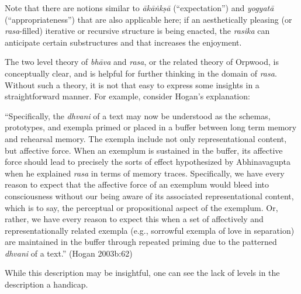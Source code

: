 Note that there are notions similar to \textsl{ākāṅkṣā} (“expectation”) and \textsl{yogyatā} (“appropriateness”) that are also applicable here; if an aesthetically pleasing (or \textsl{rasa}-filled) iterative or recursive structure is being enacted, the \textsl{rasika} can anticipate certain substructures and that increases the enjoyment.

The two level theory of \textsl{bhāva} and \textsl{rasa}, or the related theory of Orpwood, is conceptually clear, and is helpful for further thinking in the domain of \textsl{rasa}. Without such a theory, it is not that easy to express some insights in a straightforward manner. For example, consider Hogan’s explanation: 

\begin{myquote}
“Specifically, the \textsl{dhvani} of a text may now be understood as the schemas, prototypes, and exempla primed or placed in a buffer between long term memory and rehearsal memory. The exempla include not only representational content, but affective force. When an exemplum is sustained in the buffer, its affective force should lead to precisely the sorts of effect hypothesized by Abhinavagupta when he explained \textsl{rasa} in terms of memory traces. Specifically, we have every reason to expect that the affective force of an exemplum would bleed into consciousness without our being aware of its associated representational content, which is to say, the perceptual or propositional aspect of the exemplum. Or, rather, we have every reason to expect this when a set of affectively and representationally related exempla (e.g., sorrowful exempla of love in separation) are maintained in the buffer through repeated priming due to the patterned \textsl{dhvani} of a text.” 
\hfill(Hogan 2003b:62)
\end{myquote}

\eject

While this description may be insightful, one can see the lack of levels in the description a handicap.

